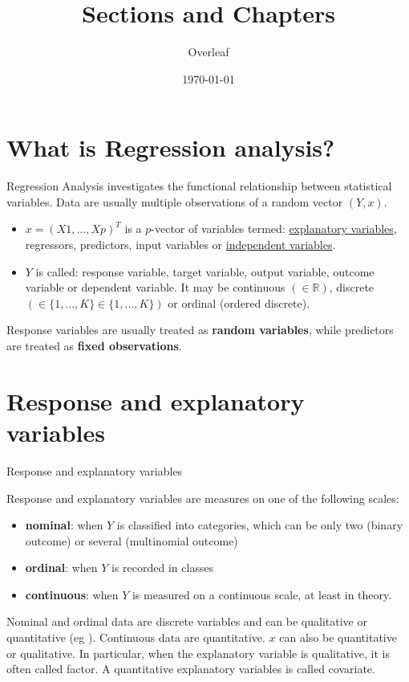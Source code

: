 \documentclass[11pt]{article}
\title{Sections and Chapters}
\author{Overleaf}
\date{\today}
\begin{document}
\maketitle
\section{What is Regression analysis?}\label{sec:what-is-regression-analysis?}

Regression Analysis investigates the functional relationship between statistical variables.
Data are usually multiple observations of a random vector $(Y,x)$.
\begin{itemize}
\item $x=(X1,\dots,Xp)^T$ is a $p$-vector of variables termed: \underline{explanatory variables}, regressors, predictors, input variables or \underline{independent variables}.
\item $Y$ is called: response variable, target variable, output variable, outcome variable or dependent variable.
It may be continuous $(\in \mathbb{R})$, discrete $(\in \{1,\dots,K\} \in \{1,\dots,K\})$ or ordinal (ordered discrete).
\end{itemize}
Response variables are usually treated as \textbf{random variables}, while predictors are treated as \textbf{fixed observations}.
\blindtext

\section{Response and explanatory variables}\label{sec:response-and-explanatory-variables}
Response and explanatory variables

Response and explanatory variables are measures on one of the following scales:
\begin{itemize}
\item \textbf{nominal}: when $Y$ is classified into categories, which can be only two (binary outcome) or several (multinomial outcome)
\item \textbf{ordinal}: when $Y$ is recorded in classes
\item \textbf{continuous}: when $Y$ is measured on a continuous scale, at least in theory.
\end{itemize}
Nominal and ordinal data are discrete variables and can be qualitative or quantitative (eg ).
Continuous data are quantitative.
$x$ can also be quantitative or qualitative.
In particular, when the explanatory variable is qualitative, it is often called factor.
A quantitative explanatory variables is called covariate.
\end{document}
